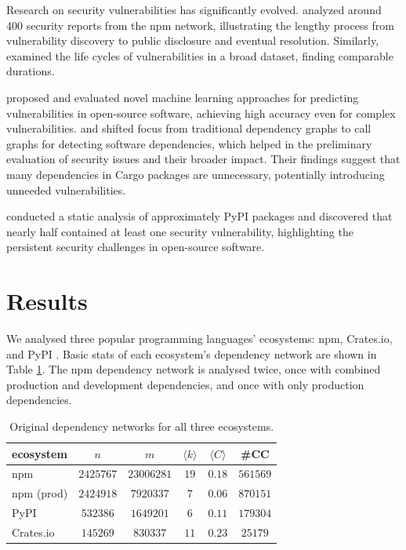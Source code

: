 \documentclass[9pt,twocolumn,twoside]{pnas-report}
\begin{document}
Research on security vulnerabilities has significantly evolved. \cite{decan2018vulnerabilities} analyzed around 400 security reports from the npm network, illustrating the lengthy process from vulnerability discovery to public disclosure and eventual resolution. Similarly, \cite{shahzad2012} examined the life cycles of vulnerabilities in a broad dataset, finding comparable durations.

\cite{HANIF2021103009} proposed and evaluated novel machine learning approaches for predicting vulnerabilities in open-source software, achieving high accuracy even for complex vulnerabilities. \cite{hejderup2018} and \cite{hejderup2022prazi} shifted focus from traditional dependency graphs to call graphs for detecting software dependencies, which helped in the preliminary evaluation of security issues and their broader impact. Their findings suggest that many dependencies in Cargo packages are unnecessary, potentially introducing unneeded vulnerabilities.

\cite{ruohonen2021} conducted a static analysis of approximately  PyPI packages and discovered that nearly half contained at least one security vulnerability, highlighting the persistent security challenges in open-source software.


\section*{Results}
We analysed three popular programming languages' ecosystems: npm, Crates.io, and PyPI .
Basic stats of each ecosystem's dependency network are shown in Table \ref{tab:basic_stats}.
The npm dependency network is analysed twice, once with combined production and development dependencies, and once with only production dependencies.

\begin{table}[h]\centering%
	\caption{Original dependency networks for all three ecosystems.}
	\begin{tabular}{l|ccccc}
		ecosystem  & $n$       & $m$        & $\langle k\rangle$ & $\langle C\rangle$ & \#CC     \\\hline
		npm        & $2425767$ & $23006281$ & $19$               & $0.18$             & $561569$ \\
		npm (prod) & $2424918$ & $7920337$  & $7$                & $0.06$             & $870151$ \\
		PyPI       & $532386$  & $1649201$  & $6$                & $0.11$             & $179304$ \\
		Crates.io  & $145269$  & $830337$   & $11$               & $0.23$             & $25179$  \\
	\end{tabular}
	\label{tab:basic_stats}
\end{table}
\end{document}
